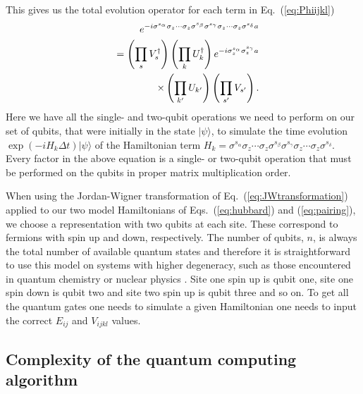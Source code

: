 \documentclass[aps,pra,twocolumn,floatfix]{revtex4}
\begin{document}
This gives us the total evolution operator for each term in
Eq.~(\ref{eq:Phiijkl})  
\begin{eqnarray}
&&e^{-i\sigma^{s_\alpha} \sigma_z \cdots \sigma_z
\sigma^{s_\beta} \sigma^{s_\gamma} \sigma_z \cdots \sigma_z
\sigma^{s_\delta} a} \notag \\
&&=\left(\prod_s V_s^\dag \right)\left(\prod_k U_k^\dag \right)
e^{-i \sigma_z^{s_\alpha}\sigma_z^{s_\gamma}a} \notag\\
&&\times\left(\prod_{k^\prime}
U_{k^\prime}\right)
\left(\prod_{s^\prime}
V_{s^\prime}\right).
\end{eqnarray}
Here we have all the single- and two-qubit operations we need to
perform on our set of qubits, that were initially in the state
$|\psi\rangle$, to simulate the time evolution $\exp(-iH_k\Delta
t)|\psi\rangle$ of the Hamiltonian term $H_k= \sigma^{s_\alpha} \sigma_z \cdots \sigma_z
\sigma^{s_\beta} \sigma^{s_\gamma} \sigma_z \cdots \sigma_z
\sigma^{s_\delta}$. Every factor in the above equation is a single- or
two-qubit operation that must be performed on the qubits in proper
matrix multiplication order.

When using the Jordan-Wigner transformation of
Eq.~(\ref{eq:JWtransformation}) applied to our two model Hamiltonians of
Eqs.~(\ref{eq:hubbard}) and (\ref{eq:pairing}), we choose a representation with two qubits at each site. These
correspond to fermions with spin up and down, respectively.
The number of qubits, $n$, is always the total number of available
quantum states and therefore
it is straightforward to use this model on systems with higher degeneracy, such
as those encountered in quantum chemistry \cite{helgaker} or nuclear physics \cite{caurier2005}. 
Site one spin up is qubit one, site one spin
down is qubit two and site two spin up is qubit three and so on.
To get all the quantum gates one needs to simulate a given Hamiltonian
one needs to input the correct $E_{ij}$ and $V_{ijkl}$ values. 



\subsection{Complexity of the quantum computing algorithm}
\label{sec:complexityOfFermionicSimulator}
\end{document}
